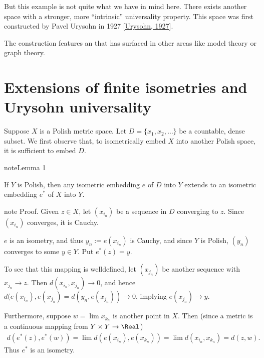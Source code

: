 \documentclass[letterpaper,10pt,english]{jupyterBook}
\begin{document}
\sphinxAtStartPar
But this example is not quite what we have in mind here. There exists another space with a stronger, more “intrinsic” universality property. This space was first constructed by Pavel Urysohn in 1927 {[}\hyperlink{cite.bibliography:id16}{Urysohn, 1927}{]}.

\sphinxAtStartPar
The construction features an  that has surfaced in other areas like model theory or graph theory.


\section{Extensions of finite isometries and Urysohn universality}
\label{\detokenize{Urysohn:extensions-of-finite-isometries-and-urysohn-universality}}
\sphinxAtStartPar
Suppose \(X\) is a Polish metric space. Let \(D = \{x_1, x_2, \dots\}\) be a countable, dense subset. We first observe that, to isometrically embed \(X\) into another Polish space, it is sufficient to embed \(D\).
\label{Urysohn:lemma-1}
\begin{sphinxadmonition}{note}{Lemma 1}



\sphinxAtStartPar
If \(Y\) is Polish, then any isometric embedding \(e\) of \(D\) into \(Y\) extends to an isometric embedding \(e^*\) of \(X\) into \(Y\).
\end{sphinxadmonition}

\begin{sphinxadmonition}{note}
\sphinxAtStartPar
Proof. Given \(z \in X\), let \((x_{i_n})\) be a sequence in \(D\) converging to \(z\). Since \((x_{i_n})\) converges, it is Cauchy.

\sphinxAtStartPar
\(e\) is an isometry, and thus \(y_n := e(x_{i_n})\) is Cauchy, and since \(Y\) is Polish, \((y_n)\) converges to some \(y \in Y\). Put \(e^*(z) = y\).

\sphinxAtStartPar
To see that this mapping is well\sphinxhyphen{}defined, let \((x_{j_n})\) be another sequence with \(x_{j_n} \to z\). Then \(d(x_{i_n}, x_{j_n}) \to 0\), and hence \(d(e(x_{i_n}),e(x_{j_n}) = d(y_n, e(x_{j_n}))\to 0\), implying \(e(x_{j_n}) \to y\).

\sphinxAtStartPar
Furthermore, suppose \(w = \lim x_{k_n}\) is another point in \(X\). Then (since a metric is a continuous mapping from \(Y\times Y \to \Real\))
\begin{equation*}
\begin{split}
	d(e^*(z), e^*(w)) = \lim d( e(x_{i_n}),  e(x_{k_n})) = \lim d(  x_{i_n}, x_{k_n}) = d(z,w).
\end{split}
\end{equation*}
\sphinxAtStartPar
Thus \(e^*\) is an isometry.
\end{sphinxadmonition}
\end{document}
